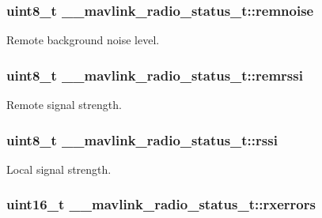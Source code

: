 \hypertarget{struct____mavlink__radio__status__t_a8c72fbe2cc42a71933ed93aa3064f2f4}{
\subsubsection[{remnoise}]{\setlength{\rightskip}{0pt plus 5cm}uint8\+\_\+t \+\_\+\+\_\+mavlink\+\_\+radio\+\_\+status\+\_\+t\+::remnoise}}\label{struct____mavlink__radio__status__t_a8c72fbe2cc42a71933ed93aa3064f2f4}


Remote background noise level. 

\hypertarget{struct____mavlink__radio__status__t_a300013070ad97c6c8cb6390c4d12e9d6}{
\subsubsection[{remrssi}]{\setlength{\rightskip}{0pt plus 5cm}uint8\+\_\+t \+\_\+\+\_\+mavlink\+\_\+radio\+\_\+status\+\_\+t\+::remrssi}}\label{struct____mavlink__radio__status__t_a300013070ad97c6c8cb6390c4d12e9d6}


Remote signal strength. 

\hypertarget{struct____mavlink__radio__status__t_a3094eceaedbb2f0d7e501a0ae29b1153}{
\subsubsection[{rssi}]{\setlength{\rightskip}{0pt plus 5cm}uint8\+\_\+t \+\_\+\+\_\+mavlink\+\_\+radio\+\_\+status\+\_\+t\+::rssi}}\label{struct____mavlink__radio__status__t_a3094eceaedbb2f0d7e501a0ae29b1153}


Local signal strength. 

\hypertarget{struct____mavlink__radio__status__t_a8685a765f489e5c207d15d2d327744d8}{
\subsubsection[{rxerrors}]{\setlength{\rightskip}{0pt plus 5cm}uint16\+\_\+t \+\_\+\+\_\+mavlink\+\_\+radio\+\_\+status\+\_\+t\+::rxerrors}}\label{struct____mavlink__radio__status__t_a8685a765f489e5c207d15d2d327744d8}


